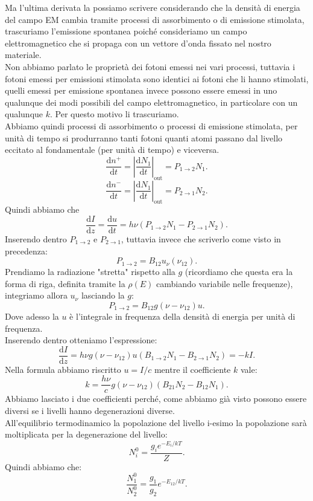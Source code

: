 Ma l'ultima derivata la possiamo scrivere considerando che la densità di energia del campo EM cambia tramite processi di assorbimento o di emissione stimolata, trascuriamo l'emissione spontanea poiché consideriamo un campo elettromagnetico che si propaga con un vettore d'onda fissato nel nostro materiale. \\
Non abbiamo parlato le proprietà dei fotoni emessi nei vari processi, tuttavia i fotoni emessi per emissioni stimolata sono identici ai fotoni che li hanno stimolati, quelli emessi per emissione spontanea invece possono essere emessi in uno qualunque dei modi possibili del campo elettromagnetico, in particolare con un qualunque $k$. Per questo motivo li trascuriamo.\\
Abbiamo quindi processi di assorbimento o processi di emissione stimolata, per unità di tempo si produrranno tanti fotoni quanti atomi passano dal livello eccitato al fondamentale (per unità di tempo) e viceversa.
\[
\frac{\text{d} n^+}{\text{d} t} = \left|\frac{\text{d} N_1}{\text{d} t} \right|_\text{out} 
= P_{1\to 2}N_1
.\] 
\[
\frac{\text{d} n^-}{\text{d} t} =\left|\frac{\text{d} N_1}{\text{d} t} \right|_\text{out} = P_{2\to 1}N_2
.\] 
Quindi abbiamo che 
\[
\frac{\text{d} I}{\text{d} z} = \frac{\text{d} u}{\text{d} t} =
h\nu \left(P_{1\to 2}N_1 - P_{2\to 1}N_2\right)
.\] 
Inserendo dentro $P_{1\to 2}$  e $P_{2\to 1}$, tuttavia invece che scriverlo come visto in precedenza:
\[
    P_{1 \to 2} = B_{12}u_\nu (\nu_{12}) 
.\] 
Prendiamo la radiazione "stretta" rispetto alla $g$ (ricordiamo che questa era la forma di riga, definita tramite la $\rho (E) $ cambiando variabile nelle frequenze), integriamo allora $u_\nu$  lasciando la $g$:
\[
    P_{1 \to 2} = B_{12}g(\nu-\nu_{12})u
.\] 
Dove adesso la $u$ è l'integrale in frequenza della densità di energia per unità di frequenza.\\
Inserendo dentro otteniamo l'espressione:
\[
    \frac{\text{d} I}{\text{d} z} = h\nu g(\nu-\nu_{12}) u\left(B_{1\to 2}N_1
    -B_{2\to 1}N_2\right)= -kI
.\] 
Nella formula abbiamo riscritto $u = I /c$  mentre il coefficiente $k$  vale:
\[
    k=\frac{h\nu}{c}g(\nu-\nu_{12})\left(B_{21}N_2 - B_{12}N_1\right) 
.\] 
Abbiamo lasciato i due coefficienti perché, come abbiamo già visto possono essere diversi se i livelli hanno degenerazioni diverse.\\ All'equilibrio termodinamico la popolazione del livello i-esimo la popolazione sarà moltiplicata per la degenerazione del livello:
\[
N_i^0 = \frac{g_i e^{- E_i /kT}}{Z}
.\] 
Quindi abbiamo che:
\[
\frac{N_1^0}{N_2^0} = \frac{g_1}{g_2}e^{-E_{12} /kT}
.\] 
